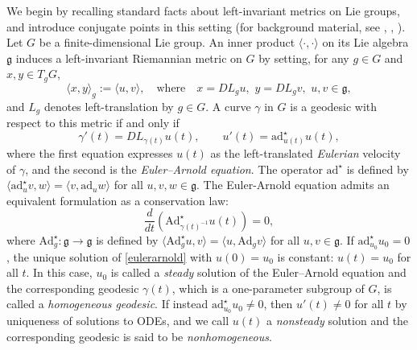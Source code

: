 \documentclass[oneside, 11pt]{amsart}
\numberwithin{equation}{section}
\newcommand{\ad}{\mathrm{ad}}
\newcommand{\Ad}{\mathrm{Ad}}
\newcommand{\Adstar}{\Ad^{\star}}
\newcommand{\adstar}{\ad^{\star}}
\newcommand{\g}{\mathfrak{g}}
\begin{document}
We begin by recalling standard facts about left-invariant metrics on Lie groups, and introduce conjugate points in this setting (for background material, see \cite{lietext}, \cite{Knapp}, \cite{Helgason}). Let $G$ be a finite-dimensional Lie group. An inner product $\langle\cdot,\cdot\rangle$ on its Lie algebra $\g$ induces a left-invariant Riemannian metric on $G$ by setting, for any $g \in G$ and $x,y \in T_g G$,
$$\langle x,y\rangle_g := \langle u,v\rangle,\quad \text{where}\quad x=DL_g u, \,\, y= DL_gv, \,\, u,v\in\g,$$
and $L_g$ denotes left-translation by $g\in G$. A curve $\gamma$ in $G$ is a geodesic with respect to this metric if and only if
\begin{equation}\label{eulerarnold}
\gamma'(t) = DL_{\gamma(t)} u(t), \qquad u'(t) = \adstar_{u(t)}u(t),
\end{equation}
where the first equation expresses $u(t)$ as the left-translated \emph{Eulerian} velocity of $\gamma$, and the second is the \emph{Euler–Arnold equation}. The operator $\adstar$ is defined by $\langle \adstar_u v, w \rangle = \langle v, \ad_u w \rangle$ for all $u,v,w \in \mathfrak{g}$. The Euler-Arnold equation admits an equivalent formulation as a conservation law:
\begin{equation}\label{eulerarnold_conservation}
\frac{d}{dt} \left( \Adstar_{\gamma(t)^{-1}} u(t) \right) = 0,
\end{equation}
where $\Adstar_g\colon \mathfrak{g} \to \mathfrak{g}$ is defined by $\langle \Adstar_g u, v \rangle = \langle u, \Ad_g v \rangle$ for all $u,v \in \mathfrak{g}$.
If $\adstar_{u_0} u_0 = 0$, the unique solution of \eqref{eulerarnold} with $u(0) = u_0$ is constant: $u(t) = u_0$ for all $t$. In this case, $u_0$ is called a \emph{steady} solution of the Euler–Arnold equation and the corresponding geodesic $\gamma(t)$, which is a one-parameter subgroup of $G$, is called a \emph{homogeneous geodesic}. If instead $\adstar_{u_0} u_0 \neq 0$, then $u'(t) \ne 0$ for all $t$ by uniqueness of solutions to ODEs, and we call $u(t)$ a \emph{nonsteady} solution and the corresponding geodesic is said to be \emph{nonhomogeneous}.
\end{document}
